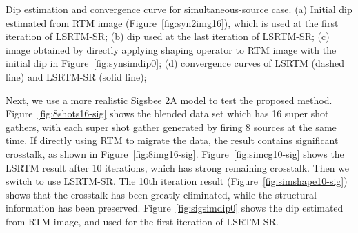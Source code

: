 { Dip estimation and convergence curve for simultaneous-source case.
(a) Initial dip estimated from RTM image (Figure~\ref{fig:syn2img16}), which is used at the first iteration of LSRTM-SR;
(b) dip used at the last iteration of LSRTM-SR;
(c) image obtained by directly applying shaping operator to RTM image with the initial dip in Figure~\ref{fig:synsimdip0};
(d) convergence curves of LSRTM (dashed line) and LSRTM-SR (solid line);
}

Next, we use a more realistic Sigsbee 2A model \cite[]{paffenholz2002} to test the proposed method. 
Figure~\ref{fig:8shots16-sig} shows the blended data set which has 16 super shot gathers,
with each super shot gather generated by firing 8 sources at the same time.
If directly using RTM to migrate the data, the result contains significant crosstalk, as shown in Figure~\ref{fig:8img16-sig}.
Figure~\ref{fig:simcg10-sig} shows the LSRTM result after 10 iterations, which has strong remaining crosstalk.
Then we switch to use LSRTM-SR. 
The 10th iteration result (Figure~\ref{fig:simshape10-sig})
shows that the crosstalk has been greatly eliminated, while the structural information has been preserved.
Figure~\ref{fig:sigsimdip0} shows the dip estimated from RTM image, and used for the first iteration of LSRTM-SR.

